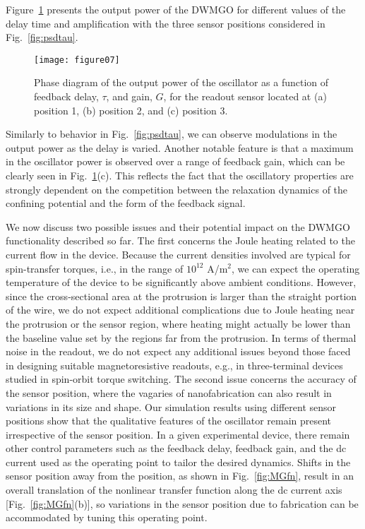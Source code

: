 \documentclass[aip,reprint,amsmath,amssymb,floatfix,superscriptaddress]{revtex4-1}
\begin{document}
Figure~\ref{fig:phasediag} presents the output power of the DWMGO for different values of the delay time and amplification with the three sensor positions considered in Fig.~\ref{fig:psdtau}.
%
\begin{figure}
\centering\texttt{[image: figure07]}
\caption{Phase diagram of the output power of the oscillator as a function of feedback delay, $\tau$, and gain, $G$, for the readout sensor located at (a) position 1, (b) position 2, and (c) position 3.}
\label{fig:phasediag}
\end{figure}
%
Similarly to behavior in Fig.~\ref{fig:psdtau}, we can observe modulations in the output power as the delay is varied. Another notable feature is that a maximum in the oscillator power is observed over a range of feedback gain, which can be clearly seen in Fig.~\ref{fig:phasediag}(c). This reflects the fact that the oscillatory properties are strongly dependent on the competition between the relaxation dynamics of the confining potential and the form of the feedback signal.


We now discuss two possible issues and their potential impact on the DWMGO functionality described so far. The first concerns the Joule heating related to the current flow in the device. Because the current densities involved are typical for spin-transfer torques, i.e., in the range of $10^{12}$ A/m$^2$, we can expect the operating temperature of the device to be significantly above ambient conditions. However, since the cross-sectional area at the protrusion is larger than the straight portion of the wire, we do not expect additional complications due to Joule heating near the protrusion or the sensor region, where heating might actually be lower than the baseline value set by the regions far from the protrusion. In terms of thermal noise in the readout, we do not expect any additional issues beyond those faced in designing suitable magnetoresistive readouts, e.g., in three-terminal devices studied in spin-orbit torque switching. The second issue concerns the accuracy of the sensor position, where the vagaries of nanofabrication can also result in variations in its size and shape. Our simulation results using different sensor positions show that the qualitative features of the oscillator remain present irrespective of the sensor position. In a given experimental device, there remain other control parameters such as the feedback delay, feedback gain, and the dc current used as the operating point to tailor the desired dynamics. Shifts in the sensor position away from the position, as shown in Fig.~\ref{fig:MGfn}, result in an overall translation of the nonlinear transfer function along the dc current axis [Fig.~\ref{fig:MGfn}(b)], so variations in the sensor position due to fabrication can be accommodated by tuning this operating point.
\end{document}
